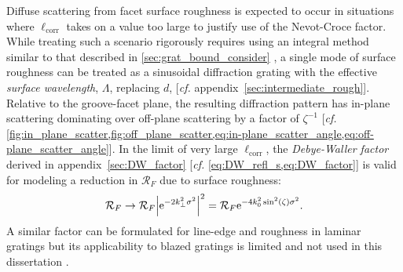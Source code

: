Diffuse scattering from facet surface roughness is expected to occur in situations where $\ell_{\text{corr}}$ takes on a value too large to justify use of the Nevot-Croce factor. 
While treating such a scenario rigorously requires using an integral method similar to that described in \cref{sec:grat_bound_consider} \cite{Daillant2009}, a single mode of surface roughness can be treated as a sinusoidal diffraction grating with the effective \emph{surface wavelength}, $\Lambda$, replacing $d$, [\emph{cf.\@} appendix~\ref{sec:intermediate_rough}]. 
Relative to the groove-facet plane, the resulting diffraction pattern has in-plane scattering dominating over off-plane scattering by a factor of $\zeta^{-1}$ [\emph{cf.\@} \cref{fig:in_plane_scatter,fig:off_plane_scatter,eq:in-plane_scatter_angle,eq:off-plane_scatter_angle}]. 
In the limit of very large $\ell_{\text{corr}}$, the \emph{Debye-Waller factor} derived in appendix~\ref{sec:DW_factor} [\emph{cf.\@} \cref{eq:DW_refl_s,eq:DW_factor}] is valid for modeling a reduction in $\mathcal{R}_F$ due to surface roughness: 
\begin{equation}
 \mathcal{R}_F \to \mathcal{R}_F \abs{\mathrm{e}^{-2 k_{\perp}^2 \sigma^2}}^2 = \mathcal{R}_F \mathrm{e}^{-4 k_0^2 \sin^2 \left( \zeta \right) \sigma^2} .
 \end{equation}
A similar factor can be formulated for line-edge and roughness in laminar gratings but its applicability to blazed gratings is limited and not used in this dissertation \cite{Fernandez19,McCurdy20}. 

